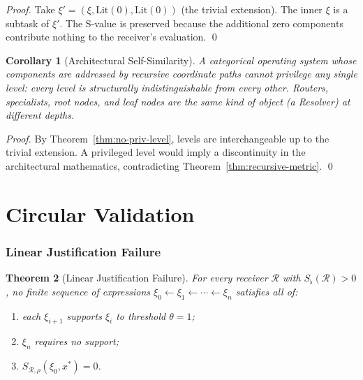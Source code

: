 \documentclass[twocolumn,a4paper]{article}
\newtheorem{theorem}{Theorem}[section]
\newtheorem{corollary}[theorem]{Corollary}
\newcommand{\receiver}{\mathcal{R}}
\newcommand{\Sscalar}{S}
\newcommand{\Sfloor}{S_{\flat}}
\begin{document}
\begin{proof}
Take $\xi'=(\xi,\mathrm{Lit}(0),\mathrm{Lit}(0))$ (the trivial extension). The inner $\xi$ is a subtask of $\xi'$. The S-value is preserved because the additional zero components contribute nothing to the receiver's evaluation. \qed
\end{proof}

\begin{corollary}[Architectural Self-Similarity]
\label{cor:arch-self-similarity}
A categorical operating system whose components are addressed by recursive coordinate paths cannot privilege any single level: every level is structurally indistinguishable from every other. Routers, specialists, root nodes, and leaf nodes are the same kind of object (a Resolver) at different depths.
\end{corollary}

\begin{proof}
By Theorem~\ref{thm:no-priv-level}, levels are interchangeable up to the trivial extension. A privileged level would imply a discontinuity in the architectural mathematics, contradicting Theorem~\ref{thm:recursive-metric}. \qed
\end{proof}

\part{Circular Validation}

\section{Linear Justification Failure}
\label{sec:linear-failure}

\begin{theorem}[Linear Justification Failure]
\label{thm:linear-failure}
For every receiver $\receiver$ with $\Sfloor(\receiver)>0$, no finite sequence of expressions $\xi_{0}\leftarrow\xi_{1}\leftarrow\cdots\leftarrow\xi_{n}$ satisfies all of:
\begin{enumerate}[nosep,label=(\roman*)]
\item each $\xi_{i+1}$ supports $\xi_{i}$ to threshold $\theta=1$;
\item $\xi_{n}$ requires no support;
\item $\Sscalar_{\receiver,\rho}(\xi_{0},x^{*})=0$.
\end{enumerate}
\end{theorem}
\end{document}
